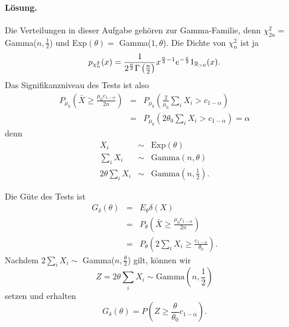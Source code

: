 \paragraph*{Lösung. } Die Verteilungen in dieser Aufgabe gehören zur Gamma-Familie, denn
$\chi^2_{2n}=$ Gamma($n,\frac{1}{2}$) und Exp$(\theta) =$ Gamma($1,\theta$). Die Dichte von $\chi^2_n$ ist ja 
\begin{equation*}
    p_{\chi^2_n} (x) = 
    \frac{1}{2^{\frac{n}{2}} \Gamma\left( \frac{n}{2} \right)} x^{ \frac{n}{2} -1}e^{-\frac{x}{2}} 1_{\mathbb R_{>0}}(x).
\end{equation*}
Das Signifikanzniveau des Tests ist also
\begin{eqnarray*}
    P_{\mu_0} \left( \bar X \geq \frac{ \mu_0 c_{1-\alpha} }{2n} \right)  
    &=& P_{\mu_0} \left( \frac{2}{\mu_0} \sum_{i}^{} X_i  > c_{1-\alpha}   \right) \\
    &=& P_{\mu_0} \left( 2 \theta_0 \sum_{i}^{} X_i > c_{1-\alpha} \right) = \alpha
\end{eqnarray*}
denn 
\begin{eqnarray*}
    X_i & \sim & \textrm{Exp}(\theta) \\
    \sum_{i}^{} X_i & \sim & \textrm{Gamma}(n,\theta) \\
    2\theta \sum_{i}^{} X_i & \sim & \textrm{Gamma}(n,\frac{1}{2}).
\end{eqnarray*}

Die Güte des Tests ist
\begin{eqnarray*}
    G_\delta (\theta) &=&  E_\theta \delta(X) \\
    &=& P_\theta \left( \bar X  \geq \frac{\mu_0 c_{1-\alpha}}{2n} \right) \\
    &=& P_\theta \left( 2 \sum_{i}^{} X_i \geq \frac{c_{1-\alpha}}{\theta_0} \right).
\end{eqnarray*}
Nachdem $2 \sum_{i} X_i \sim $ Gamma($n, \frac{\theta}{2}$) gilt, können wir 
\begin{equation*}
    Z = 2 \theta \sum_{i}^{} X_i \sim \textrm{Gamma}(n,\frac{1}{2})
\end{equation*}
setzen und erhalten
\begin{equation*}
    G_\delta(\theta) = P \left( Z \geq \frac{\theta}{\theta_0} c_{1-\alpha} \right).
\end{equation*}

